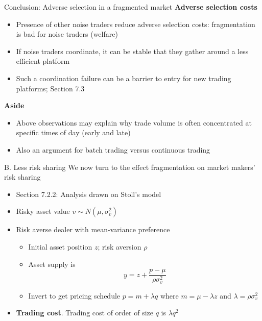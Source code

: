 \documentclass[english,10pt
,aspectratio=169
]{beamer}
\begin{document}
\begin{frame}{Conclusion: Adverse selection in a fragmented market}
	\textbf{Adverse selection costs}
	\begin{itemize}
		\item Presence of other noise traders reduce adverse selection costs: fragmentation is bad for noise traders (welfare)
		\item If noise traders coordinate, it can be stable that they gather around a less efficient platform
		\item Such a coordination failure can be a barrier to entry for new trading platforms; Section 7.3
	\end{itemize}
	\textbf{Aside}
	\begin{itemize}
		\item Above observations may explain why trade volume is often concentrated at specific times of day (early and late)
		\item Also an argument for batch trading versus continuous trading
	\end{itemize}
\end{frame}



\begin{frame}{B. Less risk sharing}
We now turn to the effect fragmentation on market makers' risk sharing
\begin{itemize}
\item Section 7.2.2: Analysis drawn on Stoll's model
\item Risky asset value $v \sim N(\mu, \sigma^{2}_{v})$
\item Risk averse dealer with mean-variance preference
\begin{itemize}
\item Initial asset position $z$; risk aversion $\rho$
\item Asset supply is
\[
y = z + \frac{p-\mu}{\rho \sigma^{2}_{v}}
\]
\item Invert to get pricing schedule $p=m+\lambda q$ where $m=\mu-\lambda z$ and $\lambda = \rho \sigma^{2}_{v}$
\end{itemize}
\item \textbf{Trading cost}. Trading cost of order of size $q$ is $\lambda q^{2}$
\end{itemize}
\end{frame}
\end{document}
